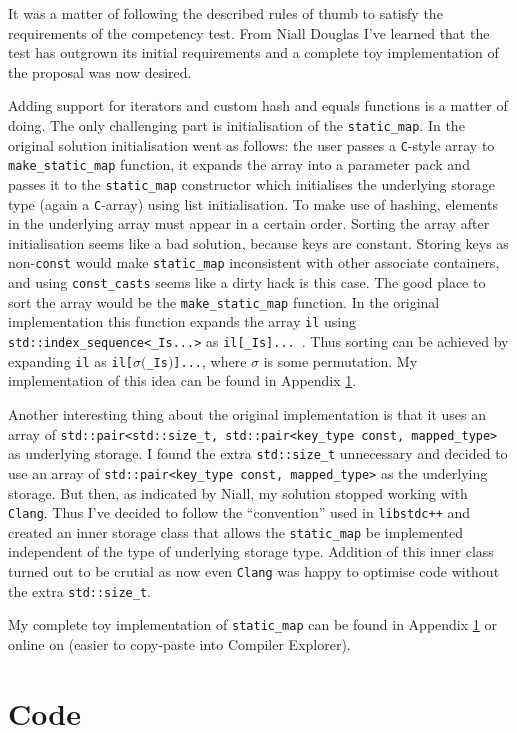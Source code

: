 \documentclass[a4paper,12pt]{article}
\begin{document}
    It was a matter of following the described rules of thumb to satisfy the requirements of the competency test. From Niall Douglas I've learned that the test has outgrown its initial requirements and a complete toy implementation of the proposal was now desired.

    Adding support for iterators and custom hash and equals functions is a matter of doing. The only challenging part is initialisation of the \texttt{static\_map}. In the original solution initialisation went as follows: the user passes a \texttt{C}-style array to \texttt{make\_static\_map} function, it expands the array into a parameter pack and passes it to the \texttt{static\_map} constructor which initialises the underlying storage type (again a \texttt{C}-array) using list initialisation. To make use of hashing, elements in the underlying array must appear in a certain order. Sorting the array after initialisation seems like a bad solution, because keys are constant. Storing keys as non-\texttt{const} would make \texttt{static\_map} inconsistent with other associate containers, and using \texttt{const\_casts} seems like a dirty hack is this case. The good place to sort the array would be the \texttt{make\_static\_map} function. In the original implementation this function expands the array \texttt{il} using \texttt{std::index\_sequence<\_Is...>} as \texttt{il[\_Is]...}\ . Thus sorting can be achieved by expanding \texttt{il} as \texttt{il[}$\sigma($\texttt{\_Is}$)$\texttt{]...}, where $\sigma$ is some permutation. My implementation of this idea can be found in Appendix \ref{competency-code}.

    Another interesting thing about the original implementation is that it uses an array of \texttt{std::pair<std::size\_t, std::pair<key\_type const, mapped\_type>} as underlying storage. I found the extra \texttt{std::size\_t} unnecessary and decided to use an array of \texttt{std::pair<key\_type const, mapped\_type>} as the underlying storage. But then, as indicated by Niall, my solution stopped working with \texttt{Clang}. Thus I've decided to follow the ``convention'' used in \texttt{libstdc++} and created an inner storage class that allows the \texttt{static\_map} be implemented independent of the type of underlying storage type. Addition of this inner class turned out to be crutial as now even \texttt{Clang} was happy to optimise code without the extra \texttt{std::size\_t}.

    My complete toy implementation of \texttt{static\_map} can be found in Appendix \ref{competency-code} or online on \url{} (easier to copy-paste into Compiler Explorer).

\appendix
\section{Code} \label{competency-code}
    \begin{spacing}{0.8}
    
    \end{spacing}
\end{document}
